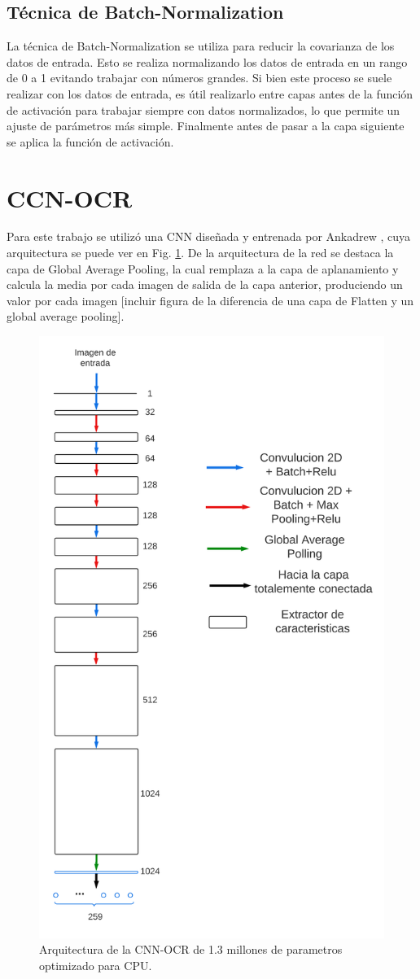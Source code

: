 \subsection{Técnica de Batch-Normalization}

La técnica de Batch-Normalization se utiliza para reducir la covarianza de los datos de entrada. Esto se realiza normalizando los datos de entrada en un rango de 0 a 1 evitando trabajar con números grandes. Si bien este proceso se suele realizar con los datos de entrada, es útil realizarlo entre capas antes de la función de activación para trabajar siempre con datos normalizados, lo que permite un ajuste de parámetros más simple. Finalmente antes de pasar a la capa siguiente se aplica la función de activación.

\section{CCN-OCR}

Para este trabajo se utilizó una CNN diseñada y entrenada por Ankadrew \cite{ankandrew_reconocedor_2023}, cuya arquitectura se puede ver en Fig. \ref{fig:arquitectura-cnn-ocr}. De la arquitectura de la red se destaca la capa de Global Average Pooling, la cual remplaza a la capa de aplanamiento y calcula la media por cada imagen de salida de la capa anterior, produciendo un valor por cada imagen [incluir figura de la diferencia de una capa de Flatten y un global average pooling].
\begin{figure}[bth]
    \centering
    \includegraphics[width=.4\textwidth]{imgs/cnn-ocr.png}
    \caption{Arquitectura de la CNN-OCR de 1.3 millones de parametros optimizado para CPU.}
    \label{fig:arquitectura-cnn-ocr}
\end{figure}

